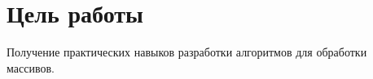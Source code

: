 \section*{Цель работы}

Получение практических навыков разработки алгоритмов для обработки массивов.